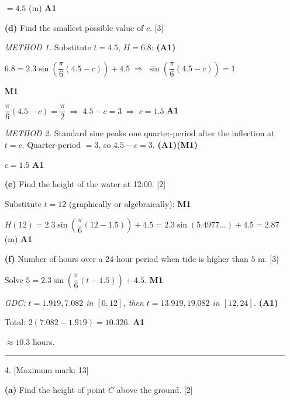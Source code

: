 \documentclass[12pt, twoside]{article}
\begin{document}
\begin{enumerate}[itemsep=0.3cm]
$= 4.5$ (m) \hfill \textbf{A1}

\medskip

\textbf{(d)} Find the smallest possible value of $c$. \hfill [3]

\medskip

\emph{METHOD 1.} Substitute $t = 4.5$, $H = 6.8$: \hfill \textbf{(A1)}

$6.8 = 2.3 \sin\!\left(\dfrac{\pi}{6}(4.5 - c)\right) + 4.5 \;\Rightarrow\; \sin\!\left(\dfrac{\pi}{6}(4.5 - c)\right) = 1$

\hfill \textbf{M1}

$\dfrac{\pi}{6}(4.5 - c) = \dfrac{\pi}{2} \;\Rightarrow\; 4.5 - c = 3 \;\Rightarrow\; c = 1.5$ \hfill \textbf{A1}

\medskip

\emph{METHOD 2.} Standard sine peaks one quarter-period after the inflection at $t = c$. Quarter-period $= 3$, so $4.5 - c = 3$. \hfill \textbf{(A1)(M1)}

$c = 1.5$ \hfill \textbf{A1}

\medskip

\textbf{(e)} Find the height of the water at 12:00. \hfill [2]

\medskip

Substitute $t = 12$ (graphically or algebraically): \hfill \textbf{M1}

$H(12) = 2.3 \sin\!\left(\dfrac{\pi}{6}(12 - 1.5)\right) + 4.5 = 2.3 \sin(5.4977\ldots) + 4.5 = 2.87$ (m) \hfill \textbf{A1}

\medskip

\textbf{(f)} Number of hours over a 24-hour period when tide is higher than $5$ m. \hfill [3]

\medskip

Solve $5 = 2.3\sin\!\left(\dfrac{\pi}{6}(t - 1.5)\right) + 4.5$. \hfill \textbf{M1}

\textit{GDC: $t = 1.919, 7.082$ in $[0, 12]$, then $t = 13.919, 19.082$ in $[12, 24]$.} \hfill \textbf{(A1)}

Total: $2(7.082 - 1.919) = 10.326$. \hfill \textbf{A1}

$\approx 10.3$ hours.

\bigskip
\hrule
\bigskip

\newpage

\item[4.] [Maximum mark: 13]

\textbf{(a)} Find the height of point $C$ above the ground. \hfill [2]


\end{enumerate}
\end{document}
